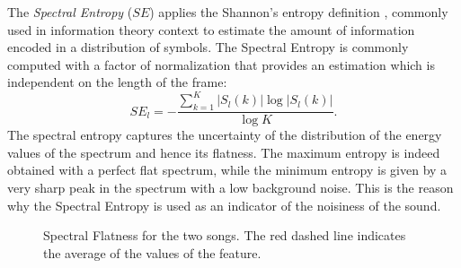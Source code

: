 The \textit{Spectral Entropy} ($SE$) applies the Shannon's entropy definition \cite{shannon2001}, commonly used in information theory context to estimate the amount of information encoded in a distribution of symbols. The Spectral Entropy is commonly computed \cite{Lartillot2007} with a factor of normalization that provides an estimation which is independent on the length of the frame:
\begin{equation}
SE_l = -\frac{\sum\limits_{k=1}^{K}|S_l(k)|\log |S_l(k)|}{\log K}.
\end{equation}
The spectral entropy captures the uncertainty of the distribution of the energy values of the spectrum and hence its flatness. The maximum entropy is indeed obtained with a perfect flat spectrum, while the minimum entropy is given by a very sharp peak in the spectrum with a low background noise. This is the reason why the Spectral Entropy is used as an indicator of the noisiness of the sound.

\begin{figure}[tb]
	\centering
	 \hfil
	\caption{Spectral Flatness for the two songs. The red dashed line indicates the average of the values of the feature.}
	\label{fig:LLFs:flatness}          
\end{figure}


